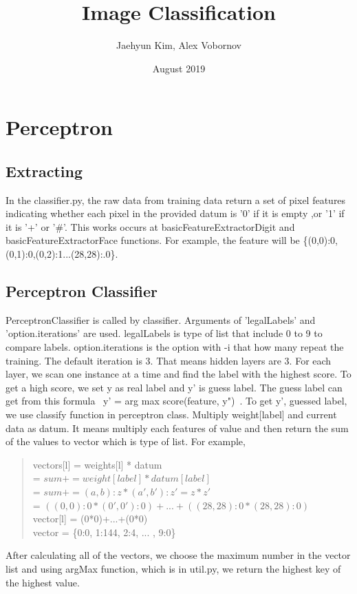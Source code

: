 \documentclass{article}
\title{Image Classification}
\author{Jaehyun Kim, Alex Vobornov}
\date{August 2019}
\begin{document}
\maketitle

\section{Perceptron}
    \subsection{Extracting}
        \hspace*{10mm}In the classifier.py, the raw data from training data return a set of pixel features indicating whether each pixel in the provided datum is '0' if it is empty ,or '1' if it is '+' or '\#'. This works occurs at basicFeatureExtractorDigit and basicFeatureExtractorFace functions. For example, the feature will be \{(0,0):0,(0,1):0,(0,2):1...(28,28):.0\}. 
   
    \subsection{Perceptron Classifier}
        \hspace*{10mm}PerceptronClassifier is called by classifier. Arguments of 'legalLabels' and 'option.iterations' are used. legalLabels is type of list that include 0 to 9 to compare labels. option.iterations is the option with -i that how many repeat the training. The default iteration is 3. That means hidden layers are 3. \newline
        For each layer, we scan one instance at a time and find the label with the highest score. To get a high score, we set y as real label and y' is guess label. The guess label can get from this formula \ y' = arg max score(feature, y")\ . \newline
        To get y', guessed label, we use classify function in perceptron class. Multiply weight[label] and current data as datum. It means multiply each features of value and then return the sum of the values to vector which is type of list. 
        For example,  
        \begin{quote}
            vectors[l] = weights[l] * datum\\
            = $sum += weight[label] * datum[label]$\\
            = $sum += (a,b):z * (a',b'):z' = z * z'$\\
            = $((0,0):0 * (0',0'):0)+...+((28,28):0 * (28,28):0)$\\
            vector[l] = (0*0)+...+(0*0)\\
            vector = \{0:0, 1:144, 2:4, ... , 9:0\}
        \end{quote}
        After calculating all of the vectors, we choose the maximum number in the vector list and using argMax function, which is in util.py, we return the highest key of the highest value.
        
\end{document}
